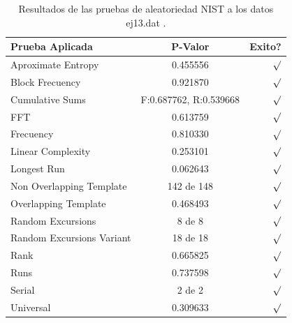 \documentclass[10pt]{IEEEtran}
\begin{document}
\begin{table}[H]
\caption{Resultados de las pruebas de aleatoriedad NIST a los datos ej13.dat .}
\label{caso9}
\begin{center}
\begin{small}
\begin{tabular}{|l|c|r|}
\hline

Prueba Aplicada &  P-Valor & Exito? \\
\hline

Aproximate Entropy    &   0.455556 & $\surd$ \\

Block Frecuency  & 0.921870 &  $\surd$  \\

Cumulative Sums    &   F:0.687762, R:0.539668 & $\surd$ \\

FFT    &   0.613759 &  $\surd$     \\

Frecuency     &  0.810330 &  $\surd$   \\

Linear Complexity      & 0.253101 & $\surd$ \\

Longest Run      &  0.062643 &    $\surd$      \\

Non Overlapping Template      & 142 de 148    &     $\surd$          \\

Overlapping Template      &  0.468493  &      $\surd$      \\

Random Excursions      & 8 de 8  &   $\surd$      \\

Random Excursions Variant & 18 de 18 &    $\surd$     \\

Rank & 0.665825  &      $\surd$      \\

Runs &   0.737598  &     $\surd$        \\

Serial &     2 de 2    &     $\surd$        \\

Universal &   0.309633 &   $\surd$            \\

\hline

\end{tabular}
\end{small}
\end{center}
\end{table}
\end{document}
